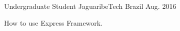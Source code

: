 \begin{cventries}
  \cventry
    {Undergraduate Student} %
    {JaguaribeTech} %
    {Brazil} %
    {Aug. 2016} %
    {
      \begin{cvitems} %
        \item {How to use Express Framework.}
      \end{cvitems}
    }

\end{cventries}
